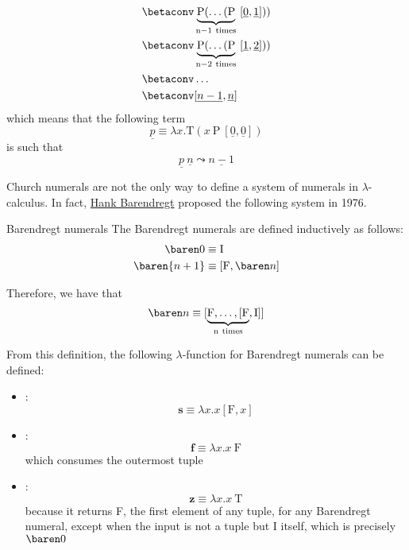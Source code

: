 \documentclass[a4paper, 12pt]{report}
\begin{document}
\begin{itemize}
\begin{equation*}
\begin{split}
                                                                            &\betaconv \underbrace{\mathrm P( \ldots (\mathrm P}_{\mathrm{n - 1 \ times}} \ [\underline 0, \underline 1])) \\
                                                                            &\betaconv \underbrace{\mathrm P( \ldots (\mathrm P}_{\mathrm{n - 2 \ times}} \ [\underline 1, \underline 2])) \\
                                                                            &\betaconv \ldots \\
                                                                            &\betaconv [\underline{n - 1}, \underline n]
                \end{split}
            \end{equation*}
            which means that the following term $$\underline p \equiv \lambda x . \mathrm T (x \ \mathrm P \ [\underline 0, \underline 0])$$ is such that $$\underline p \ \underline n \leadsto \underline{n - 1}$$
    \end{itemize}

    Church numerals are not the only way to define a system of numerals in $\lambda$-calculus. In fact, \href{https://en.wikipedia.org/wiki/Henk_Barendregt}{Hank Barendregt} proposed the following system in 1976.

    \begin{frameddefn}{Barendregt numerals}
        The Barendregt numerals are defined inductively as follows:
        \begin{equation*}
            \begin{split}
                \baren 0 &\equiv \mathrm I \\
                \baren {n + 1} &\equiv [\mathrm F, \baren n]
            \end{split}
        \end{equation*}
    \end{frameddefn}
    
    Therefore, we have that $$\baren n \equiv [\underbrace{\mathrm F, \ldots, [\mathrm F}_{\mathrm{n \ times}}, \mathrm I]]$$

    From this definition, the following $\lambda$-function for Barendregt numerals can be defined:

    \begin{itemize}
        \item {}: $$\mathbf s \equiv \lambda x. x[\mathrm F, x]$$
        \item {}: $$\mathbf f \equiv \lambda x.x \ \mathrm F$$ which consumes the outermost tuple
        \item {}: $$\mathbf z \equiv \lambda x.x \ \mathrm T$$ because it returns F, the first element of any tuple, for any Barendregt numeral, except when the input is not a tuple but I itself, which is precisely $\baren 0$
    \end{itemize}
\end{document}
